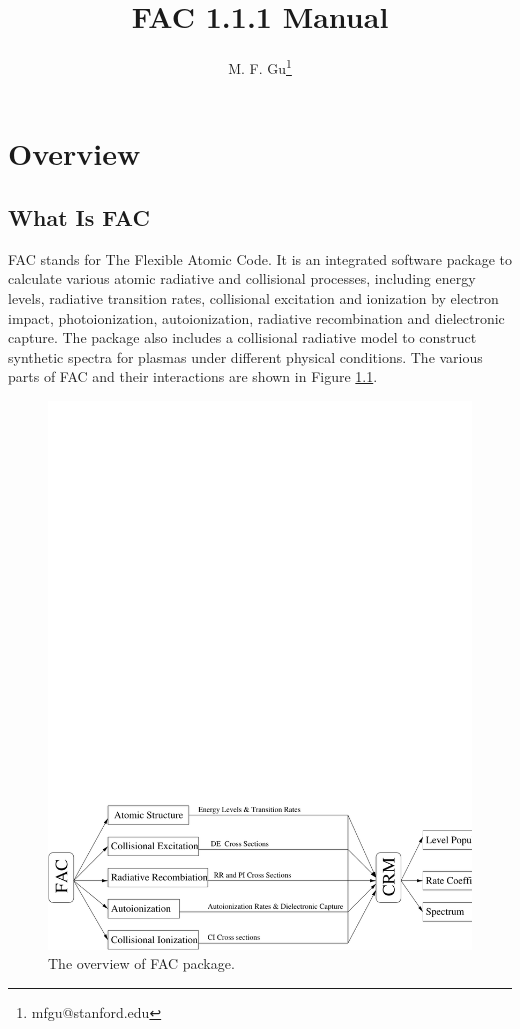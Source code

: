 \documentclass[twoside,letterpaper]{refrep}
\newcommand{\facversion}{{1.1.1}\xspace}
\begin{document}
\title{FAC \facversion Manual}
\author{M. F. Gu\thanks{mfgu@stanford.edu}}

\date{}

\maketitle

\tableofcontents

\chapter{Overview}
\label{cha:overview}

\section{What Is FAC}
FAC stands for The Flexible Atomic Code. It is an
integrated software package to calculate various atomic radiative and
collisional processes, including energy levels, radiative transition rates,
collisional excitation and 
ionization by electron impact, photoionization, autoionization, radiative
recombination and dielectronic capture. The package also includes a
collisional radiative model to construct synthetic spectra for plasmas under
different physical conditions. The various parts of FAC and their
interactions are shown in Figure \ref{fig:flow}. 

\begin{figure}
\includegraphics[width=6in,bb=0 0 655 209]{flow.pdf}
\caption{\label{fig:flow}The overview of FAC package.}
\end{figure}
\end{document}
